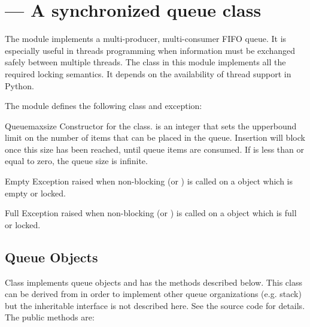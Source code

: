 \section{ ---
         A synchronized queue class}



The  module implements a multi-producer, multi-consumer
FIFO queue.  It is especially useful in threads programming when
information must be exchanged safely between multiple threads.  The
 class in this module implements all the required locking
semantics.  It depends on the availability of thread support in
Python.

\begin{seealso}
\end{seealso}

The  module defines the following class and exception:


\begin{classdesc}{Queue}{maxsize}
Constructor for the class.   is an integer that sets the
upperbound limit on the number of items that can be placed in the
queue.  Insertion will block once this size has been reached, until
queue items are consumed.  If  is less than or equal to
zero, the queue size is infinite.
\end{classdesc}

\begin{excdesc}{Empty}
Exception raised when non-blocking  (or
) is called on a  object which is
empty or locked.
\end{excdesc}

\begin{excdesc}{Full}
Exception raised when non-blocking  (or
) is called on a  object which is
full or locked.
\end{excdesc}

\subsection{Queue Objects}
\label{QueueObjects}

Class  implements queue objects and has the methods
described below.  This class can be derived from in order to implement
other queue organizations (e.g. stack) but the inheritable interface
is not described here.  See the source code for details.  The public
methods are:

